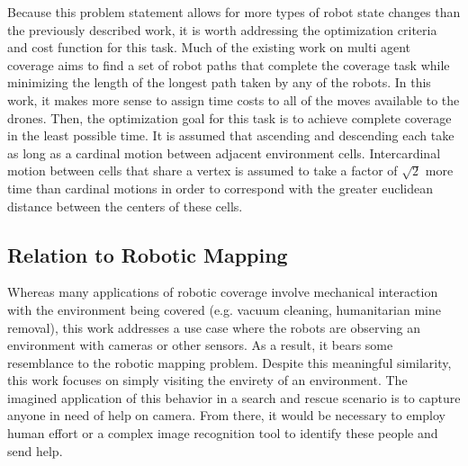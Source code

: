 Because this problem statement allows for more types of robot state changes than the previously described work, it is worth addressing the optimization criteria and cost function for this task. Much of the existing work on multi agent coverage aims to find a set of robot paths that complete the coverage task while minimizing the length of the longest path taken by any of the robots. In this work, it makes more sense to assign time costs to all of the moves available to the drones. Then, the optimization goal for this task is to achieve complete coverage in the least possible time. It is assumed that ascending and descending each take as long as a cardinal motion between adjacent environment cells. Intercardinal motion between cells that share a vertex is assumed to take a factor of $ \sqrt{2} $ more time than cardinal motions in order to correspond with the greater euclidean distance between the centers of these cells.

\subsection{Relation to Robotic Mapping}

Whereas many applications of robotic coverage involve mechanical interaction with the environment being covered (e.g. vacuum cleaning, humanitarian mine removal), this work addresses a use case where the robots are observing an environment with cameras or other sensors. As a result, it bears some resemblance to the robotic mapping problem. Despite this meaningful similarity, this work focuses on simply visiting the envirety of an environment. The imagined application of this behavior in a search and rescue scenario is to capture anyone in need of help on camera. From there, it would be necessary to employ human effort or a complex image recognition tool to identify these people and send help.

